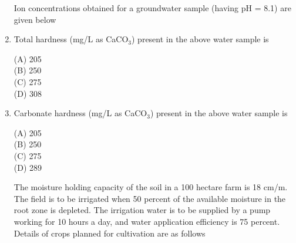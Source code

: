 \documentclass[journal,12pt,onecolumn]{IEEEtran}
\theoremstyle{remark}
\begin{document}
\begin{enumerate}
\setlength{\parskip}{0.5cm}


\noindent Ion concentrations obtained for a groundwater sample (having pH = 8.1) are given below
\begin{table}[H]
\label{table4}
\end{table}
\noindent\item Total hardness (mg/L as CaCO\(_3\)) present in the above water sample is

\setlength{\parskip}{0.5cm}

\hfill{}

\begin{multicols}{4}
\noindent(A) 205\\
(B) 250\\
(C) 275\\
(D) 308
\end{multicols}

\setlength{\parskip}{0.5cm}
\noindent\item Carbonate hardness (mg/L as CaCO\(_3\)) present in the above water sample is

\setlength{\parskip}{0.5cm}

\hfill{}

\begin{multicols}{4}
\noindent(A) 205\\
(B) 250\\
(C) 275\\
(D) 289
\end{multicols}

\setlength{\parskip}{0.5cm}


\noindent The moisture holding capacity of the soil in a 100 hectare farm is 18 cm/m. The field is to be irrigated when 50 percent of the available moisture in the root zone is depleted. The irrigation water is to be supplied by a pump working for 10 hours a day, and water application efficiency is 75 percent. Details of crops planned for cultivation are as follows


\end{enumerate}
\end{document}
